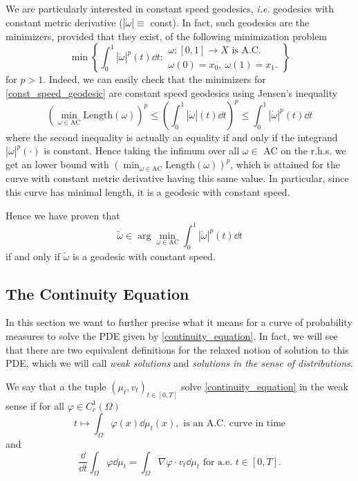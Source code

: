 We are particularly interested in constant speed geodesics, {\em i.e.} geodesics with constant metric derivative ($|\dot{\omega}| \equiv$ const). In fact, such geodesics are the minimizers, provided that they exist, of the following minimization problem
\begin{equation}
\label{const_speed_geodesic}
\min \left\{
\int_0^1 |\dot{\omega}|^p(t)\dd t: 
\begin{array}{c}
\omega :[0,1] \to X \text{ is A.C.}\\
\omega(0) = x_0, \ \omega(1) = x_1.
\end{array}
\right\}
\end{equation}
for $p>1$. Indeed, we can easily check that the minimizers for \eqref{const_speed_geodesic} are constant speed geodesics using Jensen's inequality
\begin{equation*}
\left(\min_{\omega \in \text{AC}}\text{Length}(\omega)\right)^p
\le 
\left(\int_0^1|\dot{\omega}|(t)\dd t\right)^p
\le 
\int_0^1 |\dot{\omega}|^p(t)\dd t
\end{equation*}
where the second inequality is actually an equality if and only if the integrand $|\dot{\omega}|^p(\cdot)$ is constant. Hence taking the infimum over all $\omega \in$ AC on the r.h.s. we get an lower bound with $\left(\min_{\omega \in \text{AC}}\text{Length}(\omega)\right)^p$, which is attained for the curve with constant metric derivative having this same value. In particular, since this curve has minimal length, it is a geodesic with constant speed. 

Hence we have proven that
\begin{equation}
\tilde \omega \in \arg\min_{\omega \in \text{AC}} \int_0^1|\dot{\omega}|^p(t)\dd t
\end{equation}
if and only if $\tilde \omega$ is a geodesic with constant speed. 

\subsection{The Continuity Equation}
In this section we want to further precise what it means for a curve of probability measures to solve the PDE given by \eqref{continuity_equation}. In fact, we will see that there are two equivalent definitions for the relaxed notion of solution to this PDE, which we will call {\em weak solutions} and {\em solutions in the sense of distributions}. 

\begin{definition}
	\label{definition.weak_solution}
	We say that a the tuple $(\mu_t, v_t)_{t \in [0,T]}$ solve \eqref{continuity_equation} in the weak sense if for all $\varphi \in C^1_c(\Omega)$
	\begin{equation}
	t \mapsto \int_{\Omega}\varphi(x)\dd \mu_t(x), \text{ is an A.C. curve in time}
	\end{equation}
	and 
	\begin{equation}
	\frac{\dd}{\dd t} \int_{\Omega}\varphi\dd \mu_t =
	\int_{\Omega}\nabla \varphi\cdot v_t\dd \mu_t \text{ for a.e. $t \in [0,T]$}.
	\end{equation}
\end{definition}

